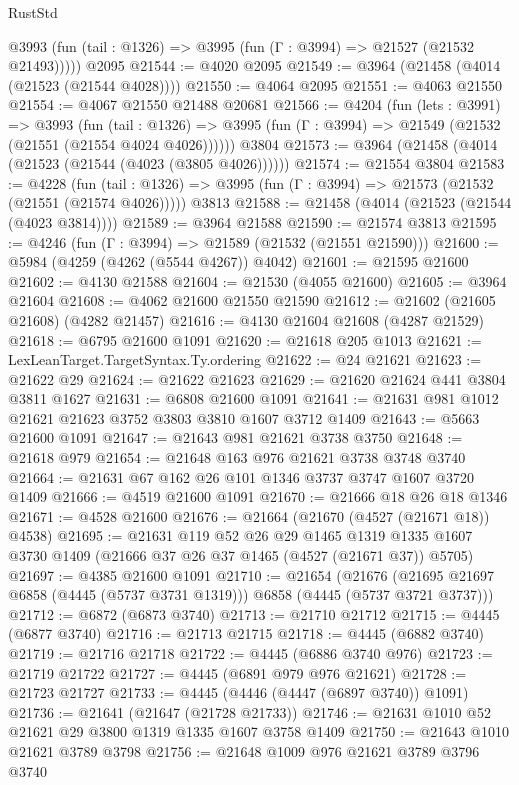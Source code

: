 \begin{lexlean}{RustStd}
\begin{coremodule}
      @3993 (fun (tail : @1326) => @3995 (fun (Γ : @3994) => @21527 (@21532 @21493)))))
    @2095
@21544 := @4020 @2095
@21549 := @3964 (@21458 (@4014 (@21523 (@21544 @4028))))
@21550 := @4064 @2095
@21551 := @4063 @21550
@21554 := @4067 @21550 @21488 @20681
@21566 := @4204
    (fun (lets : @3991) =>
    @3993
      (fun (tail : @1326) =>
      @3995 (fun (Γ : @3994) => @21549 (@21532 (@21551 (@21554 @4024 @4026))))))
    @3804
@21573 := @3964 (@21458 (@4014 (@21523 (@21544 (@4023 (@3805 @4026))))))
@21574 := @21554 @3804
@21583 := @4228
    (fun (tail : @1326) => @3995 (fun (Γ : @3994) => @21573 (@21532 (@21551 (@21574 @4026)))))
    @3813
@21588 := @21458 (@4014 (@21523 (@21544 (@4023 @3814))))
@21589 := @3964 @21588
@21590 := @21574 @3813
@21595 := @4246 (fun (Γ : @3994) => @21589 (@21532 (@21551 @21590)))
@21600 := @5984 (@4259 (@4262 (@5544 @4267)) @4042)
@21601 := @21595 @21600
@21602 := @4130 @21588
@21604 := @21530 (@4055 @21600)
@21605 := @3964 @21604
@21608 := @4062 @21600 @21550 @21590
@21612 := @21602 (@21605 @21608) (@4282 @21457)
@21616 := @4130 @21604 @21608 (@4287 @21529)
@21618 := @6795 @21600 @1091
@21620 := @21618 @205 @1013
@21621 := LexLeanTarget.TargetSyntax.Ty.ordering
@21622 := @24 @21621
@21623 := @21622 @29
@21624 := @21622 @21623
@21629 := @21620 @21624 @441 @3804 @3811 @1627
@21631 := @6808 @21600 @1091
@21641 := @21631 @981 @1012 @21621 @21623 @3752 @3803 @3810 @1607 @3712 @1409
@21643 := @5663 @21600 @1091
@21647 := @21643 @981 @21621 @3738 @3750
@21648 := @21618 @979
@21654 := @21648 @163 @976 @21621 @3738 @3748 @3740
@21664 := @21631 @67 @162 @26 @101 @1346 @3737 @3747 @1607 @3720 @1409
@21666 := @4519 @21600 @1091
@21670 := @21666 @18 @26 @18 @1346
@21671 := @4528 @21600
@21676 := @21664 (@21670 (@4527 (@21671 @18)) @4538)
@21695 := @21631
    @119
    @52
    @26
    @29
    @1465
    @1319
    @1335
    @1607
    @3730
    @1409
    (@21666 @37 @26 @37 @1465 (@4527 (@21671 @37)) @5705)
@21697 := @4385 @21600 @1091
@21710 := @21654
    (@21676 (@21695 @21697 @6858 (@4445 (@5737 @3731 @1319))) @6858 (@4445 (@5737 @3721 @3737)))
@21712 := @6872 (@6873 @3740)
@21713 := @21710 @21712
@21715 := @4445 (@6877 @3740)
@21716 := @21713 @21715
@21718 := @4445 (@6882 @3740)
@21719 := @21716 @21718
@21722 := @4445 (@6886 @3740 @976)
@21723 := @21719 @21722
@21727 := @4445 (@6891 @979 @976 @21621)
@21728 := @21723 @21727
@21733 := @4445 (@4446 (@4447 (@6897 @3740)) @1091)
@21736 := @21641 (@21647 (@21728 @21733))
@21746 := @21631 @1010 @52 @21621 @29 @3800 @1319 @1335 @1607 @3758 @1409
@21750 := @21643 @1010 @21621 @3789 @3798
@21756 := @21648 @1009 @976 @21621 @3789 @3796 @3740

\end{coremodule}
\end{lexlean}
